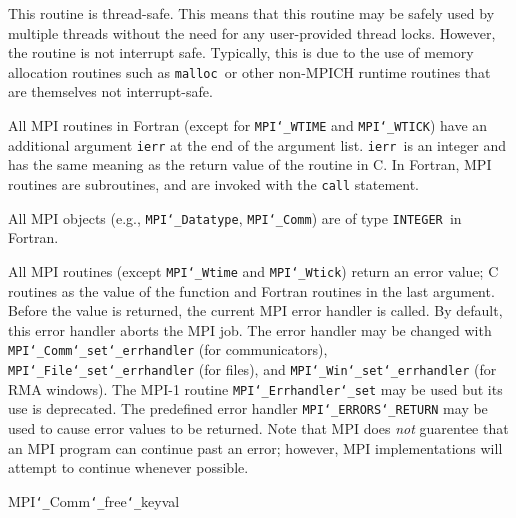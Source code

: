 \par
This routine is thread-safe.  This means that this routine may be
safely used by multiple threads without the need for any user-provided
thread locks.  However, the routine is not interrupt safe.  Typically,
this is due to the use of memory allocation routines such as {\tt malloc
}or other non-MPICH runtime routines that are themselves not interrupt-safe.
\par
{}
All MPI routines in Fortran (except for {\tt MPI{\tt \char`\_}WTIME} and {\tt MPI{\tt \char`\_}WTICK}) have
an additional argument {\tt ierr} at the end of the argument list.  {\tt ierr
}is an integer and has the same meaning as the return value of the routine
in C.  In Fortran, MPI routines are subroutines, and are invoked with the
{\tt call} statement.
\par
All MPI objects (e.g., {\tt MPI{\tt \char`\_}Datatype}, {\tt MPI{\tt \char`\_}Comm}) are of type {\tt INTEGER
}in Fortran.
\par
{}
\par
All MPI routines (except {\tt MPI{\tt \char`\_}Wtime} and {\tt MPI{\tt \char`\_}Wtick}) return an error value;
C routines as the value of the function and Fortran routines in the last
argument.  Before the value is returned, the current MPI error handler is
called.  By default, this error handler aborts the MPI job.  The error handler
may be changed with {\tt MPI{\tt \char`\_}Comm{\tt \char`\_}set{\tt \char`\_}errhandler} (for communicators),
{\tt MPI{\tt \char`\_}File{\tt \char`\_}set{\tt \char`\_}errhandler} (for files), and {\tt MPI{\tt \char`\_}Win{\tt \char`\_}set{\tt \char`\_}errhandler} (for
RMA windows).  The MPI-1 routine {\tt MPI{\tt \char`\_}Errhandler{\tt \char`\_}set} may be used but
its use is deprecated.  The predefined error handler
{\tt MPI{\tt \char`\_}ERRORS{\tt \char`\_}RETURN} may be used to cause error values to be returned.
Note that MPI does {\em not} guarentee that an MPI program can continue past
an error; however, MPI implementations will attempt to continue whenever
possible.
\par
{}
\par
{}
MPI{\tt \char`\_}Comm{\tt \char`\_}free{\tt \char`\_}keyval
\nextline
{}
\endmanpage
